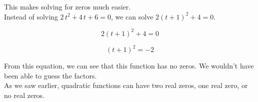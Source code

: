 \documentclass{ximera}
\begin{document}
This makes solving for zeros much easier. \\

Instead of solving $2 \, t^2 + 4 \, t + 6 = 0$, we can solve $2 (t+1)^2 + 4 = 0$.


\[
2 (t+1)^2 + 4 = 0
\]


\[
(t+1)^2 = -2
\]


From this equation, we can see that this function has no zeros. We wouldn't have been able to guess the factors. \\


As we saw earlier, quadratic functions can have two real zeros, one real zero, or no real zeros. \\
\end{document}
